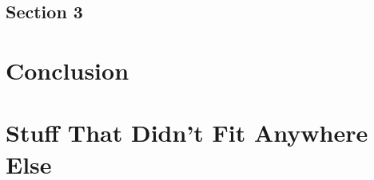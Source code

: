 \documentclass[a4paper,oneside,11pt]{book}
\begin{document}
	\section{Section 3}
	
\chapter{Conclusion}



\appendix
\chapter{Stuff That Didn't Fit Anywhere Else}




\end{document}

